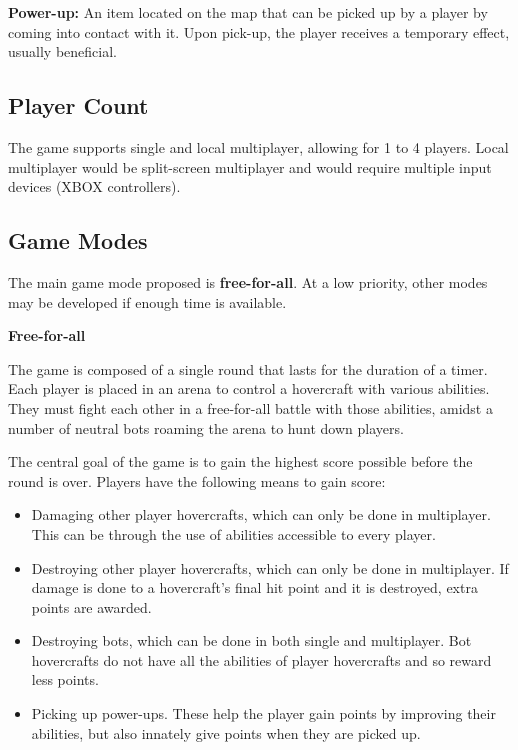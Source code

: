 \documentclass{article}
\theoremstyle{definition}
\begin{document}
\textbf{Power-up:} An item located on the map that can be picked up by a player
by coming into contact with it. Upon pick-up, the player receives a temporary
effect, usually beneficial.

\subsection{Player Count}

The game supports single and local multiplayer, allowing for 1 to 4 players.
Local multiplayer would be split-screen multiplayer and would require multiple
input devices (XBOX controllers).

\subsection{Game Modes}

The main game mode proposed is \textbf{free-for-all}. At a low priority, other
modes may be developed if enough time is available.

\textbf{Free-for-all}

The game is composed of a single round that lasts for the duration of a timer.
Each player is placed in an arena to control a hovercraft with various
abilities. They must fight each other in a free-for-all battle with those
abilities, amidst a number of neutral bots roaming the arena to hunt down
players.

The central goal of the game is to gain the highest score possible before the
round is over. Players have the following means to gain score:
\begin{itemize}
  \item Damaging other player hovercrafts, which can only be done in
    multiplayer. This can be through the use of abilities accessible to every
    player.
  \item Destroying other player hovercrafts, which can only be done in
    multiplayer. If damage is done to a hovercraft's final hit point and it is
    destroyed, extra points are awarded.
  \item Destroying bots, which can be done in both single and multiplayer.
    Bot hovercrafts do not have all the abilities of player hovercrafts and
    so reward less points.
  \item Picking up power-ups. These help the player gain points by improving
    their abilities, but also innately give points when they are picked up.
\end{itemize}
\end{document}
